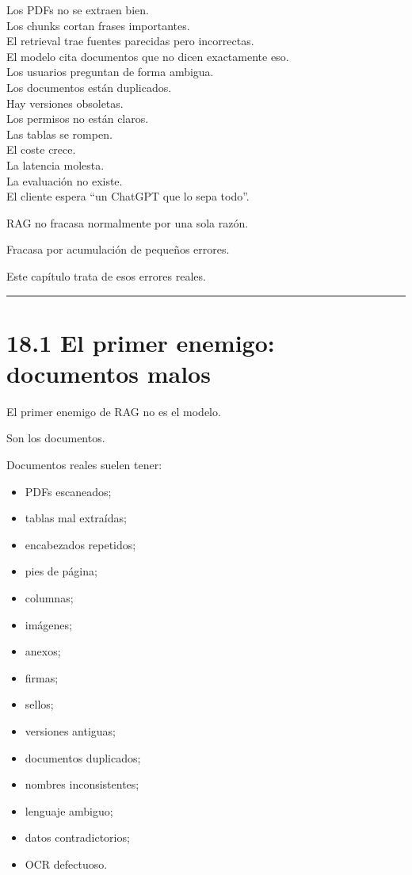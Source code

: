 Los PDFs no se extraen bien.\\
Los chunks cortan frases importantes.\\
El retrieval trae fuentes parecidas pero incorrectas.\\
El modelo cita documentos que no dicen exactamente eso.\\
Los usuarios preguntan de forma ambigua.\\
Los documentos están duplicados.\\
Hay versiones obsoletas.\\
Los permisos no están claros.\\
Las tablas se rompen.\\
El coste crece.\\
La latencia molesta.\\
La evaluación no existe.\\
El cliente espera ``un ChatGPT que lo sepa todo''.

RAG no fracasa normalmente por una sola razón.

Fracasa por acumulación de pequeños errores.

Este capítulo trata de esos errores reales.

\begin{center}\rule{0.5\linewidth}{0.5pt}\end{center}

\section{18.1 El primer enemigo: documentos
malos}\label{el-primer-enemigo-documentos-malos}

El primer enemigo de RAG no es el modelo.

Son los documentos.

Documentos reales suelen tener:

\begin{itemize}
\tightlist
\item
  PDFs escaneados;
\item
  tablas mal extraídas;
\item
  encabezados repetidos;
\item
  pies de página;
\item
  columnas;
\item
  imágenes;
\item
  anexos;
\item
  firmas;
\item
  sellos;
\item
  versiones antiguas;
\item
  documentos duplicados;
\item
  nombres inconsistentes;
\item
  lenguaje ambiguo;
\item
  datos contradictorios;
\item
  OCR defectuoso.
\end{itemize}

